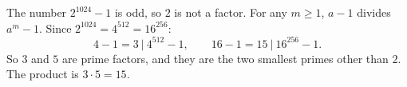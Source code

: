 The number $2^{1024}-1$ is odd, so $2$ is not a factor. For any $m\ge1$, $a-1$ divides $a^m-1$. Since $2^{1024}=4^{512}=16^{256}$:
\[
4-1=3\ \Big|\ 4^{512}-1,\qquad 16-1=15\ \Big|\ 16^{256}-1 .
\]
So $3$ and $5$ are prime factors, and they are the two smallest primes other than $2$. The product is $3\cdot5=\boxed{15}$.

